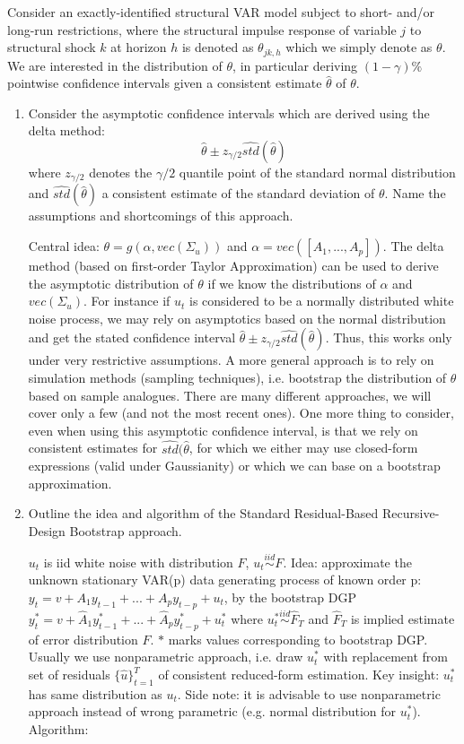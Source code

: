 Consider an exactly-identified structural VAR model subject to short- and/or long-run restrictions, where the structural impulse response of variable $j$ to structural shock $k$ at horizon $h$ is denoted as $\theta_{jk,h}$ which we simply denote as $\theta$. We are interested in the distribution of $\theta$, in particular deriving $(1-\gamma)\%$ pointwise confidence intervals given a consistent estimate $\hat{\theta}$ of $\theta$.
\begin{enumerate}
    \item Consider the asymptotic confidence intervals which are derived using the delta method: $$\hat{\theta} \pm z_{\gamma/2} \widehat{std}(\hat{\theta})$$ where $z_{\gamma/2}$ denotes the $\gamma/2$ quantile point of the standard normal distribution and $ \widehat{std}(\hat{\theta})$ a consistent estimate of the standard deviation of $\theta$. Name the assumptions and shortcomings of this approach.
          \begin{solution}
              Central idea: $\theta = g(\alpha,vec(\Sigma_u))$ and $\alpha = vec([A_1,...,A_p])$. The delta method (based on first-order Taylor Approximation) can be used to derive the asymptotic distribution of $\theta$ if we know the distributions of $\alpha$ and $vec(\Sigma_u)$. For instance if $u_t$ is considered to be a normally distributed white noise process, we may rely on asymptotics based on the normal distribution and get the stated confidence interval $\hat{\theta} \pm z_{\gamma/2} \widehat{std}(\hat{\theta})$. Thus, this works only under very restrictive assumptions. A more general approach is to rely on simulation methods (sampling techniques), i.e. bootstrap the distribution of $\theta$ based on sample analogues. There are many different approaches, we will cover only a few (and not the most recent ones). One more thing to consider, even when using this asymptotic confidence interval, is that we rely on consistent estimates for $\widehat{std}(\hat{\theta}$, for which we either may use closed-form expressions (valid under Gaussianity) or which we can base on a bootstrap approximation.
          \end{solution}
    \item Outline the idea and algorithm of the Standard Residual-Based Recursive-Design Bootstrap approach.
          \begin{solution}
              $u_t$ is iid white noise with distribution $F$, $u_t \overset{iid}{\sim} F$. Idea: approximate the unknown stationary VAR(p) data generating process of known order p: $y_t = v + A_1 y_{t-1} + ... + A_p y_{t-p} + u_t$, by the bootstrap DGP $y_t^\ast = v + \hat{A}_1 y_{t-1}^\ast + ... + \hat{A}_p y_{t-p}^\ast + u_t^\ast$ where $u_t^\ast \overset{iid}{\sim} \hat{F}_T$ and $\hat{F}_T$ is implied estimate of error distribution $F$. $\ast$ marks values corresponding to bootstrap DGP. Usually we use nonparametric approach, i.e. draw $u_t^\ast$ with replacement from set of residuals $\{\hat{u}\}_{t=1}^T$ of consistent reduced-form estimation. Key insight: $u_t^\ast$ has same distribution as $u_t$. Side note: it is advisable to use nonparametric approach instead of wrong parametric (e.g. normal distribution for $u_t^\ast$). Algorithm:

\end{solution}
\end{enumerate}
